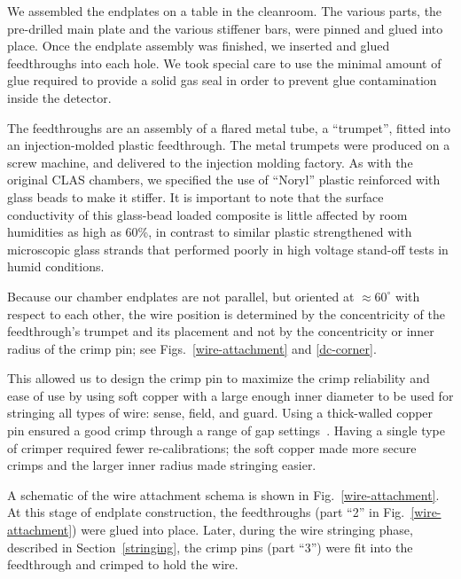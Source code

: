 We assembled the endplates on a table in the cleanroom.  The various parts,
the pre-drilled main plate and the various stiffener bars, were pinned
and glued into place.  Once the endplate assembly was finished,
we inserted and glued feedthroughs into each hole.  We took special care 
to use the minimal amount of glue required to provide a solid gas 
seal in order to prevent glue contamination inside the detector. 

The feedthroughs are an assembly of a flared metal tube, a ``trumpet'', fitted into an injection-molded 
plastic feedthrough.  The metal trumpets were produced on a screw machine, and 
delivered to the injection molding factory.
As with the original CLAS chambers, we specified the use of
``Noryl'' plastic reinforced with glass beads to make it stiffer.
It is important to note that the surface conductivity
of this glass-bead loaded composite is little affected by room humidities
as high as 60\%, in contrast to similar plastic strengthened
with microscopic glass strands that performed poorly in high voltage stand-off
tests in humid conditions.  

Because our chamber endplates are not parallel, but oriented at
$\approx 60^{\circ}$ with respect to each other, the wire position is determined
by the concentricity of the feedthrough's trumpet and its placement and not by
the concentricity or inner radius of the crimp pin; see Figs.~\ref{wire-attachment} and \ref{dc-corner}.

This allowed us to design the crimp pin to maximize the crimp reliability
and ease of use by using soft copper with a large enough inner diameter
to be used for stringing all types of wire: sense, field, and guard.
Using a thick-walled copper pin ensured a good crimp through a range of gap settings~\cite{sbc}.
Having a single type of crimper required fewer re-calibrations; the soft
copper made more secure crimps and the larger inner radius made
stringing easier.

 A schematic of the wire attachment schema is shown in
Fig.~\ref{wire-attachment}.  At this stage of endplate construction, the
feedthroughs (part ``2'' in Fig.~\ref{wire-attachment}) were glued into place.
Later, during the wire stringing phase, described in Section~\ref{stringing},
the crimp pins (part ``3'') were fit into the feedthrough and crimped to
hold the wire.  

